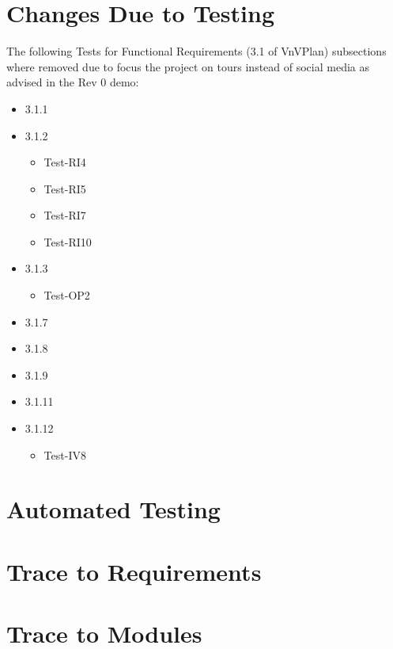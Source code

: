 \documentclass[12pt, titlepage]{article}
\begin{document}
\section{Changes Due to Testing}


The following Tests for Functional Requirements (3.1 of VnVPlan) subsections where removed due to focus the project on tours instead of social media as advised in the Rev 0 demo:
\begin{itemize}
    \item 3.1.1
    \item 3.1.2
        \begin{itemize}
            \item Test-RI4
            \item Test-RI5
            \item Test-RI7
            \item Test-RI10
        \end{itemize}
    \item 3.1.3
        \begin{itemize}
            \item Test-OP2
        \end{itemize}
    \item 3.1.7
    \item 3.1.8
    \item 3.1.9
    \item 3.1.11
    \item 3.1.12
        \begin{itemize}
            \item Test-IV8
        \end{itemize}
\end{itemize}

\section{Automated Testing}
		
\section{Trace to Requirements}
		
\section{Trace to Modules}		
\end{document}
